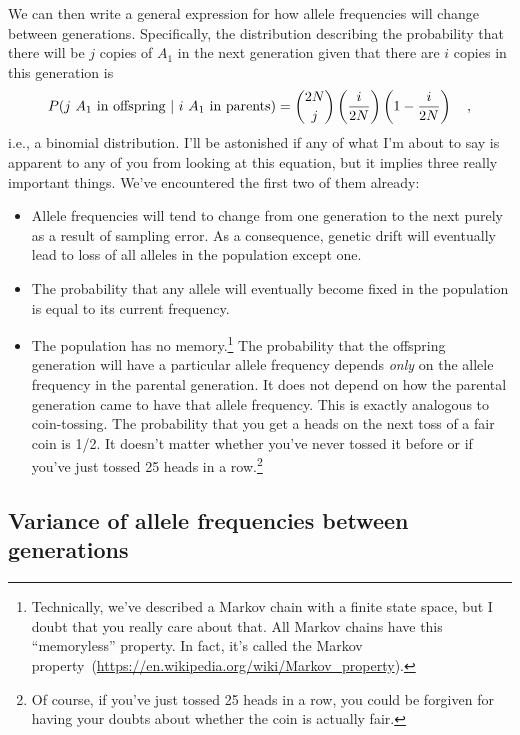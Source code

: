 \documentclass[12pt]{article}
\begin{document}
We can then write a general expression for how allele frequencies will
change between generations. Specifically, the distribution
describing the probability that there will be $j$ copies of $A_1$ in
the next generation given that there are $i$ copies in this generation
is
\[
P(\hbox{$j$ $A_1$ in offspring $|$ $i$ $A_1$ in parents}) =
{2N \choose j}\left(\frac{i}{2N}\right)\left(1 - \frac{i}{2N}\right)
\quad ,
\]
i.e., a binomial distribution. I'll be astonished if any of what I'm about to say is
apparent to any of you from looking at this equation, but it
implies three really important things. We've encountered the first two
of them already:

\begin{itemize}

\item Allele frequencies will tend to change from one generation to
the next purely as a result of sampling error. As a consequence,
genetic drift will eventually lead to loss of all alleles in the
population except one.

\item The probability that any allele will eventually become fixed in
the population is equal to its current frequency.

\item The population has no memory.\footnote{Technically, we've
    described a Markov chain with a finite state space, but I doubt
    that you really care about that. All Markov chains have this
    ``memoryless'' property. In fact, it's called the Markov
    property~(\url{https://en.wikipedia.org/wiki/Markov_property}).} The probability that the 
  offspring generation will have a particular allele frequency depends
  {\it only\/} on the allele frequency in the parental generation. It
  does not depend on how the parental generation came to have that
  allele frequency. This is exactly analogous to coin-tossing. The
  probability that you get a heads on the next toss of a fair coin is
  1/2. It doesn't matter whether you've never tossed it before or if
  you've just tossed 25 heads in a row.\footnote{Of course, if you've
    just tossed 25 heads in a row, you could be forgiven for having
    your doubts about whether the coin is actually fair.}

\end{itemize}

\subsection*{Variance of allele frequencies between
  generations}
\end{document}
